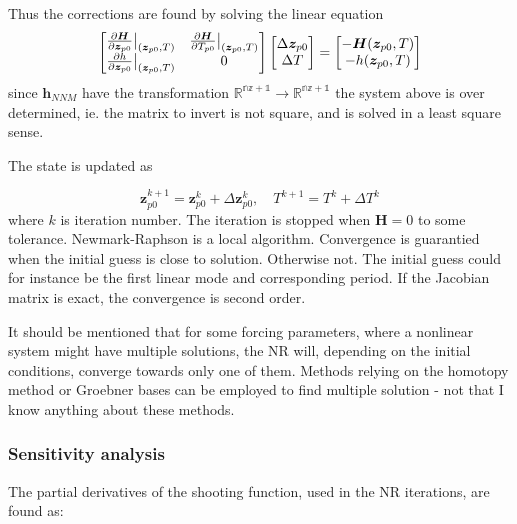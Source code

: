 Thus the corrections are found by solving the linear equation
\begin{equation}
  \label{eq:sm_nr_sol}
  \begin{bmatrix}
    \frac{\partial \bm H}{\partial \bm z_{p0}}\big|_{(\bm z_{p0},T)} &
    \frac{\partial \bm H}{\partial T_{p0}}\big|_{(\bm z_{p0},T)} \\
    \frac{\partial h}{\partial \bm z_{p0}}\big|_{(\bm z_{p0},T)} &
    0
  \end{bmatrix}
  \begin{bmatrix}
    \Delta \bm z_{p0} \\
    \Delta T
  \end{bmatrix}
  =
  \begin{bmatrix}
    -\bm H(\bm z_{p0},T) \\
    -h(\bm z_{p0},T)
  \end{bmatrix}
\end{equation}
since $\bm h_{NNM}$ have the transformation $\mathbb{R^{nz+1}} \rightarrow
\mathbb{R^{nz+1}}$ the system above is over determined, ie. the matrix to
invert is not square, and is solved in a least square sense.

The state is updated as

\begin{equation}
  \label{eq:sm_nr_update}
  \bm z^{k+1}_{p0} = \bm z^k_{p0} + \Delta \bm z^k_{p0}, \quad
  T^{k+1} = T^k + \Delta T^k
\end{equation}
where $k$ is iteration number. The iteration is stopped when $\bm H = 0$ to
some tolerance. Newmark-Raphson is a local algorithm. Convergence is guarantied
when the initial guess is close to solution. Otherwise not. The initial guess
could for instance be the first linear mode and corresponding period. If the
Jacobian matrix is exact, the convergence is second order.

It should be mentioned that for some forcing parameters, where a nonlinear
system might have multiple solutions, the NR will, depending on the initial
conditions, converge towards only one of them. Methods relying on the homotopy
method or Groebner bases can be employed to find multiple solution - not that I
know anything about these methods.

\subsubsection{Sensitivity analysis}
\label{sec:sm_sens_ana}

The partial derivatives of the shooting function, used in the NR iterations, are
found as:

